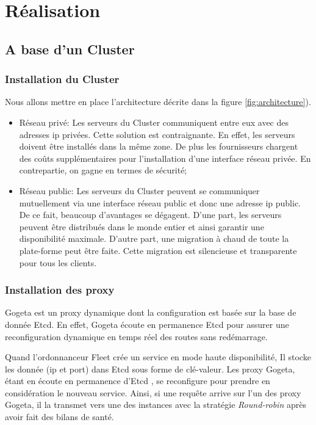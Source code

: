 \chapter{Réalisation}
\begin{onehalfspace}

\newpage

\section{A base d'un Cluster}

\subsection{Installation du Cluster}

Nous allons mettre en place l'architecture décrite dans la figure \ref{fig:architecture}). 


\begin{itemize}
	\item Réseau privé: Les serveurs du Cluster communiquent entre eux avec des adresses \acrshort{ip} privées. Cette solution est contraignante. En effet, les serveurs doivent être installés dans la même zone. De plus les fournisseurs chargent des coûts supplémentaires pour l'installation d'une interface réseau privée. En contrepartie, on gagne en termes de sécurité;
	\item Réseau public: Les serveurs du Cluster peuvent se communiquer mutuellement via une interface réseau public et donc une adresse \acrshort{ip} public. De ce fait, beaucoup d'avantages se dégagent. D'une part, les serveurs peuvent être distribués dans le monde entier et ainsi garantir une disponibilité maximale. D'autre part, une migration à chaud de toute la plate-forme peut être faite. Cette migration est silencieuse et transparente pour tous les clients.
\end{itemize}

\subsection{Installation des proxy}

Gogeta est un proxy dynamique dont la configuration est basée sur la base de donnée Etcd. En effet, Gogeta écoute en permanence Etcd pour assurer une reconfiguration dynamique en temps réel des routes sans redémarrage.

Quand l'ordonnanceur Fleet crée un service en mode haute disponibilité, Il stocke les donnée (\acrshort{ip} et port) dans Etcd sous forme de clé-valeur. Les proxy Gogeta, étant en écoute en permanence d'Etcd , se reconfigure pour prendre en considération le nouveau service. Ainsi, si une requête arrive sur l'un des proxy Gogeta, il la transmet vers une des instances avec la stratégie \emph{Round-robin} après avoir fait des bilans de santé.


\end{onehalfspace}
